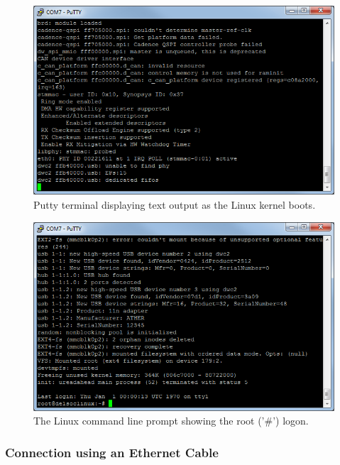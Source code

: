 \documentclass[11pt, twoside, pdftex]{article}
\begin{document}
\begin{figure}[H]
   \begin{center}
       \includegraphics[scale=0.7]{figures/fig_putty_tut_3}
   \end{center}
   \caption{Putty terminal displaying text output as the Linux kernel boots.}
	\label{fig:putty_3}
\end{figure}

\begin{figure}[H]
   \begin{center}
       \includegraphics[scale=0.7]{figures/fig_putty_tut_4}
   \end{center}
   \caption{The Linux command line prompt showing the root ('\#') logon.}
	\label{fig:putty_4}
\end{figure}

\subsubsection{Connection using an Ethernet Cable}
\end{document}
